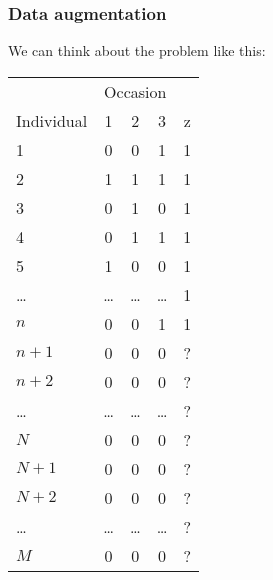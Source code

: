 \documentclass[color=usenames,dvipsnames]{beamer}\usepackage[]{graphicx}\usepackage[]{color}
\begin{document}
\begin{frame}
  \frametitle{Data augmentation}
  \footnotesize
  We can think about the problem like this: \\
  \centering
  \vfill
  \begin{tabular}{lcccc}
    \hline
               & \multicolumn{3}{c}{Occasion} \\
    \cline{2-4}
    Individual & 1     & 2     & 3     & z    \\
    \hline
    1          & 0     & 0     & 1     & 1    \\
    2          & 1     & 1     & 1     & 1            \\
    3          & 0     & 1     & 0     & 1            \\
    4          & 0     & 1     & 1     & 1            \\
    5          & 1     & 0     & 0     & 1            \\
    \dots      & \dots & \dots & \dots      & 1        \\
    $n$        & 0     & 0     & 1     & 1            \\
    \hline
    $n+1$      & 0     & 0     & 0     & ?            \\
    $n+2$      & 0     & 0     & 0     & ?            \\
    \dots      & \dots & \dots & \dots     & ?        \\
    $N$        & 0     & 0     & 0     & ?            \\
    \hline
    $N+1$      & 0     & 0     & 0     & ?            \\
    $N+2$      & 0     & 0     & 0     & ?            \\
    \dots      & \dots & \dots & \dots     & ?        \\
    $M$      & 0     & 0     & 0     & ?            \\
    \hline
  \end{tabular}
\end{frame}
\end{document}
